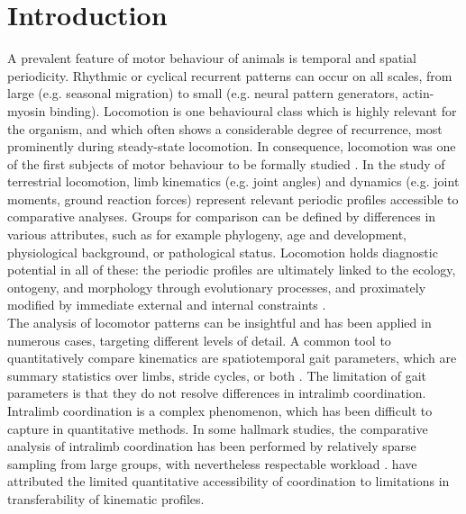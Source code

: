 \clearpage
\section{Introduction}
A prevalent feature of motor behaviour of animals is temporal and spatial periodicity.
Rhythmic or cyclical recurrent patterns can occur on all scales, from large (e.g. seasonal migration) to small (e.g. neural pattern generators, actin-myosin binding).
Locomotion is one behavioural class which is highly relevant for the organism, and which often shows a considerable degree of recurrence, most prominently during steady-state locomotion.
In consequence, locomotion was one of the first subjects of motor behaviour to be formally studied \citep{Marey1878,Muybridge1893,Braune1904,Bernstein1927a,Bernstein1927b}.
In the study of terrestrial locomotion, limb kinematics (e.g. joint angles) and dynamics (e.g. joint moments, ground reaction forces) represent relevant periodic profiles accessible to comparative analyses.
Groups for comparison can be defined by differences in various attributes, such as for example phylogeny, age and development, physiological background, or pathological status.
Locomotion holds diagnostic potential in all of these: the periodic profiles are ultimately linked to the ecology, ontogeny, and morphology through evolutionary processes, and proximately modified by immediate external and internal constraints \citep[e.g.][]{Barrett2008,McGibbon2003,Mohling2014,Nyakatura2012,Nyakatura2019,Vanhooydonck2014,VandenHole2018}.
\\The analysis of locomotor patterns can be insightful and has been applied in numerous cases, targeting different levels of detail.
A common tool to quantitatively compare kinematics are spatiotemporal gait parameters, which are summary statistics over limbs, stride cycles, or both \citep[see e.g.][]{Christiansen2002,Biancardi2012}.
The limitation of gait parameters is that they do not resolve differences in intralimb coordination.
Intralimb coordination is a complex phenomenon, which has been difficult to capture in quantitative methods.
In some hallmark studies, the comparative analysis of intralimb coordination has been performed by relatively sparse sampling from large groups, with nevertheless respectable workload \citep{Stoessel2012,Fischer2002,Isler2005}.
\citet[][]{Gatesy2011} have attributed the limited quantitative accessibility of coordination to limitations in transferability of kinematic profiles.
